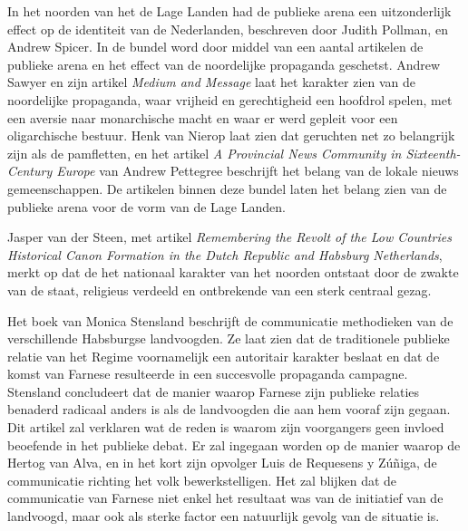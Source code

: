 \documentclass[11pt]{amsart}
\begin{document}
In het noorden van het de Lage Landen had de publieke arena een uitzonderlijk effect op de identiteit van de
Nederlanden, beschreven door Judith Pollman, en Andrew Spicer\autocite{pollmannPublicOpinionChanging2007}. In de bundel
word door middel van een aantal artikelen de publieke arena en het effect van de noordelijke propaganda geschetst.
Andrew Sawyer en zijn artikel \textit{Medium and Message} laat het karakter zien van de noordelijke propaganda, waar
vrijheid en gerechtigheid een hoofdrol spelen, met een aversie naar monarchische macht en waar er werd gepleit voor een
oligarchische bestuur. Henk van Nierop\autocite{vannieropYeShallHear2007} laat zien dat geruchten net zo belangrijk
zijn als de pamfletten, en het artikel \textit{A Provincial News Community in Sixteenth-Century Europe} van Andrew
Pettegree\autocite{pettegreeProvincialNewsCommunity2007} beschrijft het belang van de lokale nieuws gemeenschappen. De
artikelen binnen deze bundel laten het belang zien van de publieke arena voor de vorm van de Lage Landen.

Jasper van der Steen, met artikel \textit{Remembering the Revolt of the Low Countries Historical Canon Formation in the
     Dutch Republic and Habsburg Netherlands}\autocite{vandersteenRememberingRevoltLow2018}, merkt op dat de het nationaal
karakter van het noorden ontstaat door de zwakte van de staat, religieus verdeeld en ontbrekende van een sterk centraal
gezag.

Het boek van Monica Stensland beschrijft de communicatie methodieken van de verschillende Habsburgse landvoogden. Ze
laat zien dat de traditionele publieke relatie van het Regime voornamelijk een autoritair karakter beslaat en dat de
komst van Farnese resulteerde in een succesvolle propaganda campagne\autocite{stenslandHabsburgCommunicationDutch2012}.
Stensland concludeert dat de manier waarop Farnese zijn publieke relaties benaderd radicaal anders is als de
landvoogden die aan hem vooraf zijn gegaan. Dit artikel zal verklaren wat de reden is waarom zijn voorgangers geen
invloed beoefende in het publieke debat. Er zal ingegaan worden op de manier waarop de Hertog van Alva, en in het kort
zijn opvolger Luis de Requesens y Zúñiga, de communicatie richting het volk bewerkstelligen. Het zal blijken dat de
communicatie van Farnese niet enkel het resultaat was van de initiatief van de landvoogd, maar ook als sterke factor
een natuurlijk gevolg van de situatie is.

\newpage
\end{document}
